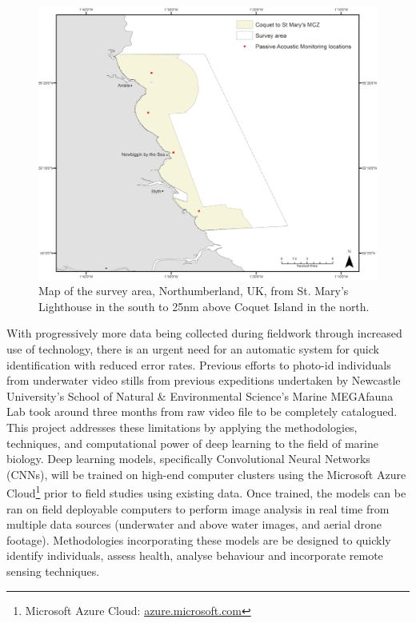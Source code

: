 \begin{figure}[H]
	\begin{center}
		\includegraphics[width=\linewidth]{Chapter1/figs/map.png}
	\end{center}
	\caption{Map of the survey area, Northumberland, UK, from St. Mary's Lighthouse in the south to 25nm above Coquet Island in the north.}
	\label{fig:map}
\end{figure}

With progressively more data being collected during fieldwork through increased use of technology, there is an urgent need for an automatic system for quick identification with reduced error rates. Previous efforts to photo-id individuals from underwater video stills from previous expeditions undertaken by Newcastle University's School of Natural \& Environmental Science's Marine MEGAfauna Lab took around three months from raw video file to be completely catalogued. This project addresses these limitations by applying the methodologies, techniques, and computational power of deep learning to the field of marine biology. Deep learning models, specifically Convolutional Neural Networks (CNNs), will be trained on high-end computer clusters using the Microsoft Azure Cloud\footnote{Microsoft Azure Cloud: \href{http://azure.microsoft.com}{azure.microsoft.com}} prior to field studies using existing data. Once trained, the models can be ran on field deployable computers to perform image analysis in real time from multiple data sources (underwater and above water images, and aerial drone footage). Methodologies incorporating these models are be designed to quickly identify individuals, assess health, analyse behaviour and incorporate remote sensing techniques. 

